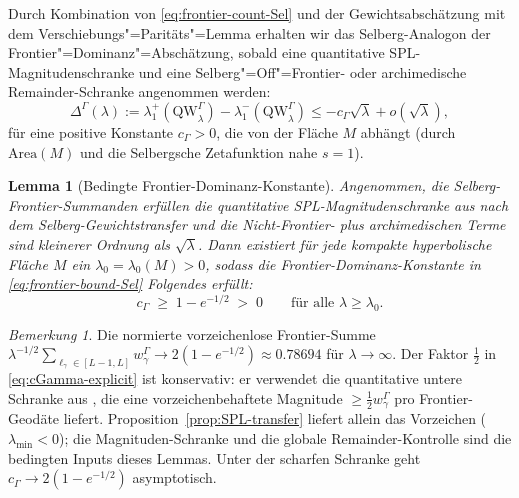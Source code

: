\documentclass[12pt,a4paper]{article}
\newtheorem{lemma}[theorem]{Lemma}
\theoremstyle{definition}
\theoremstyle{remark}
\newtheorem{remark}[theorem]{Bemerkung}
\newcommand{\QW}{\mathrm{QW}}
\begin{document}
Durch Kombination von \eqref{eq:frontier-count-Sel} und der Gewichtsabschätzung mit dem
Verschiebungs"=Paritäts"=Lemma erhalten wir das Selberg-Analogon der
Frontier"=Dominanz"=Abschätzung, sobald eine quantitative SPL-Magnitudenschranke
und eine Selberg"=Off"=Frontier- oder archimedische Remainder-Schranke angenommen werden:
\begin{equation}
\label{eq:frontier-bound-Sel}
\Delta^\Gamma(\lambda) := \lambda_1^+(\QW^\Gamma_\lambda) - \lambda_1^-(\QW^\Gamma_\lambda)
\le -c_\Gamma\sqrt{\lambda} + o(\sqrt{\lambda}),
\end{equation}
für eine positive Konstante $c_\Gamma > 0$, die von der Fläche $M$ abhängt (durch
$\mathrm{Area}(M)$ und die Selbergsche Zetafunktion nahe $s=1$).

\begin{lemma}[Bedingte Frontier-Dominanz-Konstante]
\label{lem:frontier-constant}
Angenommen, die Selberg-Frontier-Summanden erfüllen die quantitative
SPL-Magnitudenschranke aus \cite[Lem.~A.3]{Geiger2026partII} nach dem
Selberg-Gewichtstransfer und die Nicht-Frontier- plus archimedischen Terme sind
kleinerer Ordnung als $\sqrt{\lambda}$. Dann existiert für jede kompakte
hyperbolische Fläche $M$ ein $\lambda_0 = \lambda_0(M) > 0$, sodass die
Frontier-Dominanz-Konstante in \eqref{eq:frontier-bound-Sel} Folgendes erfüllt:
\begin{equation}
\label{eq:cGamma-explicit}
c_\Gamma \;\ge\; 1-e^{-1/2} \;>\; 0
\qquad\text{für alle }\lambda \ge \lambda_0.
\end{equation}
\end{lemma}

\begin{remark}
Die normierte vorzeichenlose Frontier-Summe $\lambda^{-1/2}\sum_{\ell_\gamma\in[L-1,L]}
w^\Gamma_\gamma \to 2(1-e^{-1/2}) \approx 0.78694$ für $\lambda\to\infty$.
Der Faktor $\tfrac{1}{2}$ in \eqref{eq:cGamma-explicit} ist konservativ: er verwendet
die quantitative untere Schranke aus \cite[Lem.~A.3]{Geiger2026partII}, die
eine vorzeichenbehaftete Magnitude $\ge\tfrac{1}{2}w^\Gamma_\gamma$ pro Frontier-Geodäte liefert.
Proposition~\ref{prop:SPL-transfer} liefert allein das Vorzeichen ($\lambda_{\min}<0$);
die Magnituden-Schranke und die globale Remainder-Kontrolle sind die bedingten
Inputs dieses Lemmas.
Unter der scharfen Schranke geht $c_\Gamma \to 2(1-e^{-1/2})$ asymptotisch.
\end{remark}
\end{document}

